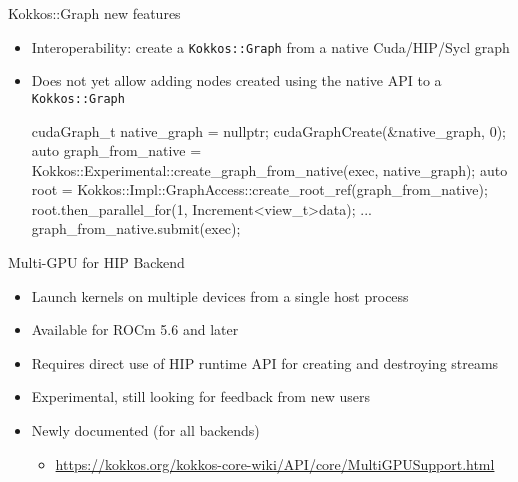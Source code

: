 \begin{frame}[fragile]{Kokkos::Graph new features}
 \begin{itemize}
   \item Interoperability: create a \texttt{Kokkos::Graph} from a native Cuda/HIP/Sycl graph
   \item Does not yet allow adding nodes created using the native API to a \texttt{Kokkos::Graph}
     \begin{code}[keywords={create_graph_from_native}]
cudaGraph_t native_graph = nullptr;
cudaGraphCreate(&native_graph, 0);
auto graph_from_native =
  Kokkos::Experimental::create_graph_from_native(exec, native_graph);
auto root = Kokkos::Impl::GraphAccess::create_root_ref(graph_from_native);
root.then_parallel_for(1, Increment<view_t>{data});
...
graph_from_native.submit(exec);
     \end{code}
 \end{itemize}
\end{frame}





\begin{frame}[fragile]{Multi-GPU for HIP Backend}
  \begin{itemize}
    \item Launch kernels on multiple devices from a single host process
    \item Available for ROCm 5.6 and later
    \item Requires direct use of HIP runtime API for creating and destroying streams
    \item Experimental, still looking for feedback from new users
    \item Newly documented (for all backends)  
      \begin{itemize} 
        \item[] \url{https://kokkos.org/kokkos-core-wiki/API/core/MultiGPUSupport.html}
      \end{itemize}
  \end{itemize}
\end{frame}

